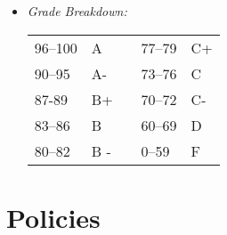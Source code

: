 \documentclass[article,oneside]{memoir}
\begin{document}
\begin{itemize}
\item \textit{Grade Breakdown:}

 \begin{tabular}{ | l | l | p{2cm} | l | l | }
    \hline 
96--100 & A  & &  77--79 &  C+ \\  
90--95 & A- & &  73--76 & C \\
87-89 & B+ &  &  70--72 & C- \\ 
83--86 & B  & &  60--69 & D\\
80--82 & B - & & 0--59 & F\\ \hline
    \end{tabular}


\end{itemize}





\section{Policies}
\end{document}

